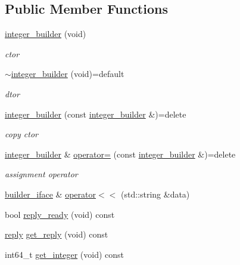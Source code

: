 \subsection*{Public Member Functions}
\begin{DoxyCompactItemize}
\item 
\hyperlink{classcpp__redis_1_1builders_1_1integer__builder_a9ff2d3d27da0fb8b98fc4a0ea255fece}{integer\+\_\+builder} (void)
\begin{DoxyCompactList}\small\item\em ctor \end{DoxyCompactList}\item 
\hyperlink{classcpp__redis_1_1builders_1_1integer__builder_ab2b797dd89b1bdec50f8ccf07633162f}{$\sim$integer\+\_\+builder} (void)=default
\begin{DoxyCompactList}\small\item\em dtor \end{DoxyCompactList}\item 
\hyperlink{classcpp__redis_1_1builders_1_1integer__builder_ab451b7fe5de8cf6f618cf9be1569aa41}{integer\+\_\+builder} (const \hyperlink{classcpp__redis_1_1builders_1_1integer__builder}{integer\+\_\+builder} \&)=delete
\begin{DoxyCompactList}\small\item\em copy ctor \end{DoxyCompactList}\item 
\hyperlink{classcpp__redis_1_1builders_1_1integer__builder}{integer\+\_\+builder} \& \hyperlink{classcpp__redis_1_1builders_1_1integer__builder_a259905e8a34765d6ff9d2dd64f444b54}{operator=} (const \hyperlink{classcpp__redis_1_1builders_1_1integer__builder}{integer\+\_\+builder} \&)=delete
\begin{DoxyCompactList}\small\item\em assignment operator \end{DoxyCompactList}\item 
\hyperlink{classcpp__redis_1_1builders_1_1builder__iface}{builder\+\_\+iface} \& \hyperlink{classcpp__redis_1_1builders_1_1integer__builder_ae29f074134f7269db7f947b0fcbe312e}{operator$<$$<$} (std\+::string \&data)
\item 
bool \hyperlink{classcpp__redis_1_1builders_1_1integer__builder_a4893dc36d06d75094bb4fe3fbc826966}{reply\+\_\+ready} (void) const
\item 
\hyperlink{classcpp__redis_1_1reply}{reply} \hyperlink{classcpp__redis_1_1builders_1_1integer__builder_a25221763ba6f8b740458c673945208e0}{get\+\_\+reply} (void) const
\item 
int64\+\_\+t \hyperlink{classcpp__redis_1_1builders_1_1integer__builder_af68431c4c81242c1930b3b4feb2028e5}{get\+\_\+integer} (void) const
\end{DoxyCompactItemize}
